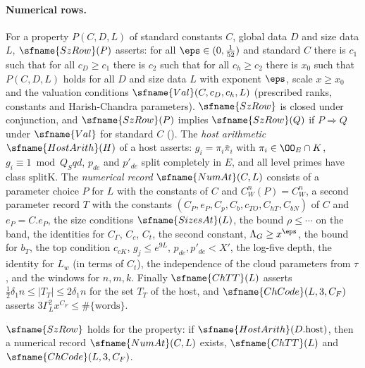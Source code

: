 \paragraph{Numerical rows.} For a property $P(C,D,L)$ of standard constants $C$, global data $D$ and size data $L$, $\sfname{SzRow}(P)$
asserts: for all $\eps\in(0,\frac1{52})$ and standard $C$ there is $c_1$ such that for all $c_D\ge c_1$ there is $c_2$ such that for all
$c_h\ge c_2$ there is $x_0$ such that $P(C,D,L)$ holds for all $D$ and size data $L$ with exponent $\eps$, scale $x\ge x_0$ and the
valuation conditions $\sfname{Val}(C,c_D,c_h,L)$ (prescribed ranks, constants and Harish-Chandra parameters). $\sfname{SzRow}$ is closed
under conjunction, and $\sfname{SzRow}(P)$ implies $\sfname{SzRow}(Q)$ if $P\Rightarrow Q$ under $\sfname{Val}$ for standard $C$
(). The \emph{host arithmetic} $\sfname{HostArith}(H)$ of a host asserts: $g_i=\pi_i\bar\pi_i$ with
$\pi_i\in\OO_E\cap K$, $g_i\equiv1\bmod Q_Sqd$, $p_{de}$ and $p'_{de}$ split completely in $E$, and all level primes have class
$\mathrm{splitK}$. The \emph{numerical record} $\sfname{NumAt}(C,L)$ consists of a parameter choice $P$ for $L$ with the constants of $C$
and $C^n_W(P)=C^n_W$, a second parameter record $T$ with the constants $(C_P,e_P,C_p,C_b,c_{TO},C_{hT},C_{bN})$ of $C$ and $e_P=C.e_P$, the
size conditions $\sfname{SizesAt}(L)$, the bound $\rho\le\cdots$ on the band, the identities for $C_\Gamma$, $C_c$, $C_t$, the second
constant, $\Lambda_G\ge x^\eps$, the bound for $b_T$, the top condition $c_{cK}$, $g_j\le e^{9L}$, $p_{de},p'_{de}<X'$, the log-five
depth, the identity for $L_w$ (in terms of $C_t$), the independence of the cloud parameters from $\tau$, and the windows for
$n,m,k$. Finally $\sfname{ChTT}(L)$ asserts $\frac12\delta_1n\le|T_T|\le2\delta_1n$ for the set $T_T$ of the host, and
$\sfname{ChCode}(L,3,C_F)$ asserts $3\Gamma_L^2x^{C_F}\le\#\{\text{words}\}$.

\begin{proposition}\label{pf:sh-div:szrow}
$\sfname{SzRow}$ holds for the property: if $\sfname{HostArith}(D.\mathrm{host})$, then a numerical record $\sfname{NumAt}(C,L)$ exists,
$\sfname{ChTT}(L)$ and $\sfname{ChCode}(L,3,C_F)$.
\end{proposition}

